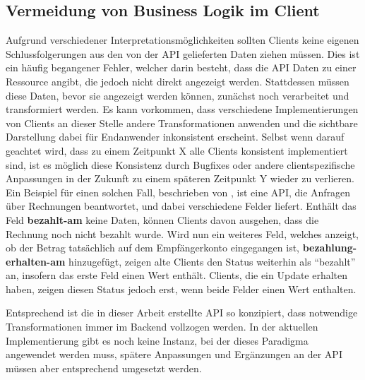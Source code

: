 \subsection{Vermeidung von Business Logik im Client}\label{subsec:api_client_no_business_logic}
Aufgrund verschiedener Interpretationsmöglichkeiten sollten Clients keine eigenen Schlussfolgerungen aus den von der API gelieferten Daten ziehen müssen. Dies ist ein häufig begangener Fehler, welcher darin besteht, dass die API Daten zu einer Ressource angibt, die jedoch nicht direkt angezeigt werden. Stattdessen müssen diese Daten, bevor sie angezeigt werden können, zunächst noch verarbeitet und transformiert werden. Es kann vorkommen, dass verschiedene Implementierungen von Clients an dieser Stelle andere Transformationen anwenden und die sichtbare Darstellung dabei für Endanwender inkonsistent erscheint. Selbst wenn darauf geachtet wird, dass zu einem Zeitpunkt X alle Clients konsistent implementiert sind, ist es möglich diese Konsistenz durch Bugfixes oder andere clientspezifische Anpassungen in der Zukunft zu einem späteren Zeitpunkt Y wieder zu verlieren. Ein Beispiel für einen solchen Fall, beschrieben von  \parencite*[vgl.][]{sturgeon_2017}, ist eine API, die Anfragen über Rechnungen beantwortet, und dabei verschiedene Felder liefert. Enthält das Feld \textbf{bezahlt-am} keine Daten, können Clients davon ausgehen, dass die Rechnung noch nicht bezahlt wurde. Wird nun ein weiteres Feld, welches anzeigt, ob der Betrag tatsächlich auf dem Empfängerkonto eingegangen ist, \textbf{bezahlung-erhalten-am} hinzugefügt, zeigen alte Clients den Status weiterhin als \enquote{bezahlt} an, insofern das erste Feld einen Wert enthält. Clients, die ein Update erhalten haben, zeigen diesen Status jedoch erst, wenn beide Felder einen Wert enthalten.

Entsprechend ist die in dieser Arbeit erstellte API so konzipiert, dass notwendige Transformationen immer im Backend vollzogen werden. In der aktuellen Implementierung gibt es noch keine Instanz, bei der dieses Paradigma angewendet werden muss, spätere Anpassungen und Ergänzungen an der API müssen aber entsprechend umgesetzt werden.
